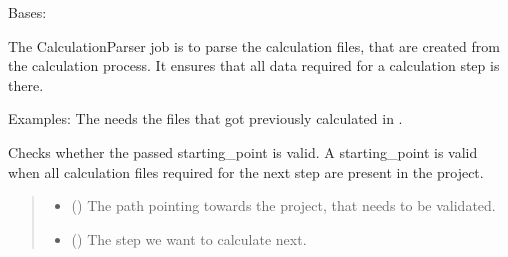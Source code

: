 \documentclass[letterpaper,10pt,english]{sphinxmanual}
\begin{document}
\begin{fulllineitems}
\label{\detokenize{apidoc/src.osm_configurator.model.parser:src.osm_configurator.model.parser.calculation_parser_interface.CalculationParserInterface}}
\pysigstartsignatures
{}
\pysigstopsignatures
\sphinxAtStartPar
Bases: 

\sphinxAtStartPar
The CalculationParser job is to parse the calculation files, that are created from the calculation process.
It ensures that all data required for a calculation step is there.

\sphinxAtStartPar
Examples: The  needs the
files that got previously calculated in .

\begin{fulllineitems}
\label{\detokenize{apidoc/src.osm_configurator.model.parser:src.osm_configurator.model.parser.calculation_parser_interface.CalculationParserInterface.check_validity_of_calculation_step}}
\pysigstartsignatures
{}
\pysigstopsignatures
\sphinxAtStartPar
Checks whether the passed starting\_point is valid.
A starting\_point is valid when all calculation files required for the next step are present in the project.
\begin{quote}\begin{description}
\begin{itemize}
\item {} 
\sphinxAtStartPar
{} () \textendash{} The path pointing towards the project, that needs to be validated.

\item {} 
\sphinxAtStartPar
{} ({\hyperref[\detokenize{apidoc/src.osm_configurator.model.project.calculation:src.osm_configurator.model.project.calculation.calculation_phase_enum.CalculationPhase}]{}}) \textendash{} The step we want to calculate next.


\end{itemize}
\end{description}
\end{quote}
\end{fulllineitems}
\end{fulllineitems}
\end{document}
